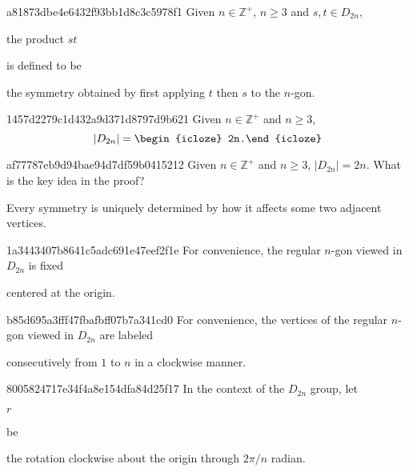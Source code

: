 \begin{note}{a81873dbe4e6432f93bb1d8c3c5978f1}
   Given \({ n \in \mathbb Z^{+} }\), \({ n \geq 3 }\) and \({ s, t \in D_{2n} }\), \begin{icloze}{2}the product \({ st }\)\end{icloze} is defined to be \begin{icloze}{1}the symmetry obtained by first applying \({ t }\) then \({ s }\) to the \({ n }\)-gon.\end{icloze}
\end{note}

\begin{note}{1457d2279c1d432a9d371d8797d9b621}
   Given \({ n \in \mathbb Z^{+} }\) and \({ n \geq 3 }\),
   \[
       \lvert D_{2n} \rvert = \begin{icloze}{1}2n.\end{icloze}
   \]
\end{note}

\begin{note}{af77787eb9d94bae94d7df59b0415212}
   Given \({ n \in \mathbb Z^{+} }\) and \({ n \geq 3 }\), \({ \lvert D_{2n} \rvert = 2n. }\)
   What is the key idea in the proof?

   \begin{cloze}{1}
       Every symmetry is uniquely determined by how it affects some two adjacent vertices.
   \end{cloze}
\end{note}

\begin{note}{1a3443407b8641c5adc691e47eef2f1e}
    For convenience, the regular \({ n }\)-gon viewed in \({ D_{2n} }\) is fixed \begin{icloze}{1}centered at the origin.\end{icloze}
\end{note}

\begin{note}{b85d695a3fff47fbafbff07b7a341cd0}
    For convenience, the vertices of the regular \({ n }\)-gon viewed in \({ D_{2n} }\) are labeled \begin{icloze}{1}consecutively from \({ 1 }\) to \({ n }\) in a clockwise manner.\end{icloze}
\end{note}

\begin{note}{8005824717e34f4a8e154dfa84d25f17}
    In the context of the \({ D_{2n} }\) group, let \begin{icloze}{2}\({ r }\)\end{icloze} be \begin{icloze}{1}the rotation clockwise about the origin through \({ 2\pi / n }\) radian.\end{icloze}
\end{note}

